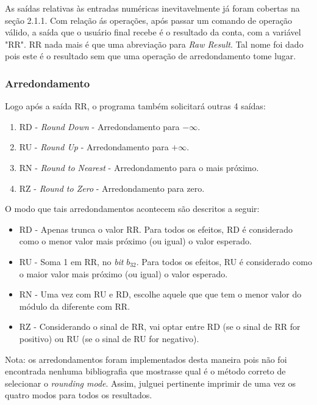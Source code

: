 \documentclass[11pt]{article}
\begin{document}
\indent\indent As saídas relativas às entradas numéricas inevitavelmente já foram cobertas na seção 2.1.1. Com relação ás operações, após passar um comando de operação válido,
a saída que o usuário final recebe é o resultado da conta, com a variável "RR". RR nada mais é que uma abreviação para \textit{Raw Result}. Tal nome foi dado pois este é o resultado sem que
uma operação de arredondamento tome lugar.

\subsubsection{Arredondamento}

\indent\indent Logo após a saída RR, o programa também solicitará outras 4 saídas:

\begin{enumerate}
  \item RD - \textit{Round Down} - Arredondamento para $ -\infty $.
  \item RU - \textit{Round Up} - Arredondamento para $ +\infty $.
  \item RN - \textit{Round to Nearest} - Arredondamento para o mais próximo.
  \item RZ - \textit{Round to Zero} - Arredondamento para zero.
\end{enumerate}

O modo que tais arredondamentos acontecem são descritos a seguir:

\begin{itemize}
  \item RD - Apenas trunca o valor RR. Para todos os efeitos, RD é considerado como o menor valor mais próximo (ou igual) o valor esperado.
  \item RU - Soma 1 em RR, no \textit{bit} $ b_{32} $. Para todos os efeitos, RU é considerado como o maior valor mais próximo (ou igual) o valor esperado.
  \item RN - Uma vez com RU e RD, escolhe aquele que que tem o menor valor do módulo da diferente com RR.
  \item RZ - Considerando o sinal de RR, vai optar entre RD (se o sinal de RR for positivo) ou RU (se o sinal de RU for negativo).
\end{itemize}

Nota: os arredondamentos foram implementados desta maneira pois não foi encontrada nenhuma bibliografia que mostrasse qual é o método correto de selecionar o \textit{rounding mode}.
Assim, julguei pertinente imprimir de uma vez os quatro modos para todos os resultados.
\end{document}
